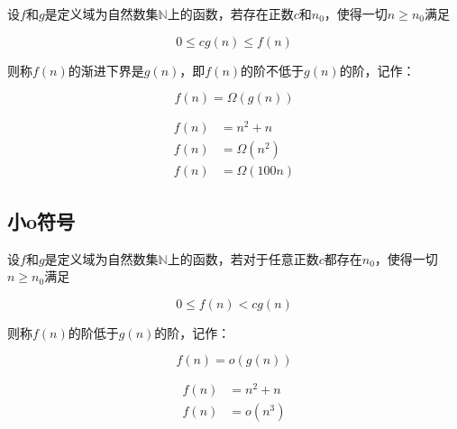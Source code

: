 设$ f $和$ g $是定义域为自然数集$ \mathbb{N} $上的函数，若存在正数$ c $和$ n_0 $，使得一切$ n \ge n_0 $满足

\vspace{-0.5cm}

$$
	0 \le cg(n) \le f(n)
$$

则称$ f(n) $的渐进下界是$ g(n) $，即$ f(n) $的阶不低于$ g(n) $的阶，记作：

\vspace{-0.5cm}

$$
	f(n) = \Omega(g(n))
$$

\vspace{0.5cm}


\vspace{-1cm}

\begin{align*}
	f(n) & = n^2 + n      \\
	f(n) & = \Omega(n^2)  \\
	f(n) & = \Omega(100n)
\end{align*}

\vspace{0.5cm}

\subsection{小o符号}

设$ f $和$ g $是定义域为自然数集$ \mathbb{N} $上的函数，若对于任意正数$ c $都存在$ n_0 $，使得一切$ n \ge n_0 $满足

\vspace{-0.5cm}

$$
	0 \le f(n) < cg(n)
$$

则称$ f(n) $的阶低于$ g(n) $的阶，记作：

\vspace{-0.5cm}

$$
	f(n) = o(g(n))
$$

\vspace{0.5cm}


\vspace{-1cm}

\begin{align*}
	f(n) & = n^2 + n \\
	f(n) & = o(n^3)
\end{align*}

\vspace{0.5cm}

